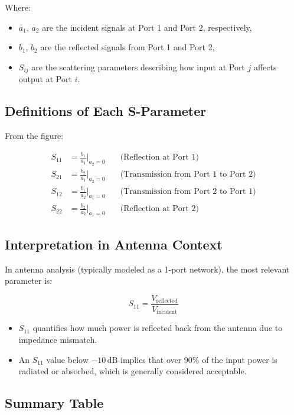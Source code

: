 Where:
\begin{itemize}
    \item $a_1$, $a_2$ are the incident signals at Port 1 and Port 2, respectively,
    \item $b_1$, $b_2$ are the reflected signals from Port 1 and Port 2,
    \item $S_{ij}$ are the scattering parameters describing how input at Port $j$ affects output at Port $i$.
\end{itemize}

\subsection*{Definitions of Each S-Parameter}

From the figure:

\begin{align*}
S_{11} &= \frac{b_1}{a_1} \Big|_{a_2 = 0} \quad &\text{(Reflection at Port 1)} \\
S_{21} &= \frac{b_2}{a_1} \Big|_{a_2 = 0} \quad &\text{(Transmission from Port 1 to Port 2)} \\
S_{12} &= \frac{b_1}{a_2} \Big|_{a_1 = 0} \quad &\text{(Transmission from Port 2 to Port 1)} \\
S_{22} &= \frac{b_2}{a_2} \Big|_{a_1 = 0} \quad &\text{(Reflection at Port 2)}
\end{align*}

\subsection*{Interpretation in Antenna Context}

In antenna analysis (typically modeled as a 1-port network), the most relevant parameter is:

\[
S_{11} = \frac{V_{\text{reflected}}}{V_{\text{incident}}}
\]

\begin{itemize}
    \item $S_{11}$ quantifies how much power is reflected back from the antenna due to impedance mismatch.
    \item An $S_{11}$ value below $-10\,\mathrm{dB}$ implies that over 90\% of the input power is radiated or absorbed, which is generally considered acceptable.
\end{itemize}

\subsection*{Summary Table}

